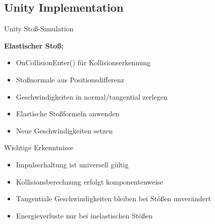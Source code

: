 \subsection{Unity Implementation}


\begin{concept}{Unity Stoß-Simulation}

    \textbf{Elastischer Stoß:}
    \begin{itemize}
        \item OnCollisionEnter() für Kollisionserkennung
        \item Stoßnormale aus Positionsdifferenz
        \item Geschwindigkeiten in normal/tangential zerlegen
        \item Elastische Stoßformeln anwenden
        \item Neue Geschwindigkeiten setzen
    \end{itemize}
\end{concept}

\begin{theorem}{Wichtige Erkenntnisse}
    \begin{itemize}
        \item Impulserhaltung ist universell gültig
        \item Kollisionsberechnung erfolgt komponentenweise
        \item Tangentiale Geschwindigkeiten bleiben bei Stößen unverändert
        \item Energieverluste nur bei inelastischen Stößen
    \end{itemize}
\end{theorem}

\multend